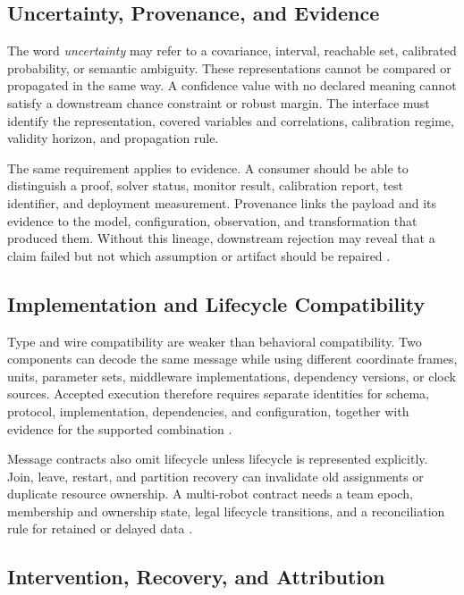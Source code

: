 \subsection{Uncertainty, Provenance, and Evidence}

The word \emph{uncertainty} may refer to a covariance, interval, reachable set,
calibrated probability, or semantic ambiguity.  These representations cannot be
compared or propagated in the same way.  A confidence value with no declared
meaning cannot satisfy a downstream chance constraint or robust margin.  The
interface must identify the representation, covered variables and correlations,
calibration regime, validity horizon, and propagation rule.

The same requirement applies to evidence.  A consumer should be able to
distinguish a proof, solver status, monitor result, calibration report, test
identifier, and deployment measurement.  Provenance links the payload and its
evidence to the model, configuration, observation, and transformation that
produced them.  Without this lineage, downstream rejection may reveal that a
claim failed but not which assumption or artifact should be repaired
\cite{w3c2013prov}.

\subsection{Implementation and Lifecycle Compatibility}

Type and wire compatibility are weaker than behavioral compatibility.  Two
components can decode the same message while using different coordinate frames,
units, parameter sets, middleware implementations, dependency versions, or
clock sources.  Accepted execution therefore requires separate identities for
schema, protocol, implementation, dependencies, and configuration, together
with evidence for the supported combination
\cite{macenski2022ros2,omg2015dds,kronauer2021latency}.

Message contracts also omit lifecycle unless lifecycle is represented
explicitly.  Join, leave, restart, and partition recovery can invalidate old
assignments or duplicate resource ownership.  A multi-robot contract needs a
team epoch, membership and ownership state, legal lifecycle transitions, and a
reconciliation rule for retained or delayed data
\cite{luckcuck2022compositional}.

\subsection{Intervention, Recovery, and Attribution}

